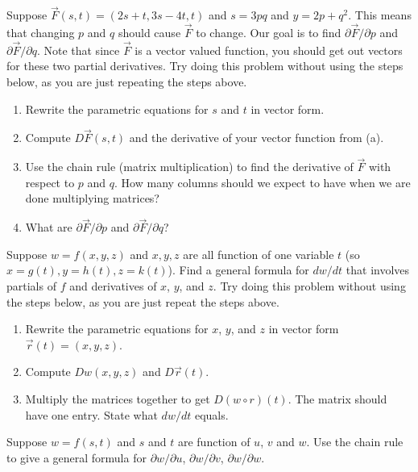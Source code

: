 \begin{problem}
 Suppose $\vec F(s,t) = (2s+t,3s-4t,t)$ and $s=3pq$ and $y=2p+q^2$.  This means that changing $p$ and $q$ should cause $\vec F$ to change. Our goal is to find $\partial \vec F/\partial p$ and $\partial \vec F/\partial q$. Note that since $\vec F$ is a vector valued function, you should get out vectors for these two partial derivatives. Try doing this problem without using the steps below, as you are just repeating the steps above.
 \begin{enumerate}
  \item Rewrite the parametric equations for $s$ and $t$ in vector form.
  \item Compute $D\vec F(s,t)$ and the derivative of your vector function from (a).  
  \item Use the chain rule (matrix multiplication) to find the derivative of $\vec F$ with respect to $p$ and $q$.  How many columns should we expect to have when we are done multiplying matrices?
  \item What are $\partial \vec F/\partial p$ and $\partial \vec F/\partial q$? 
 \end{enumerate}
\end{problem}


\begin{problem}%
 Suppose $w=f(x,y,z)$ and $x,y,z$ are all function of one variable $t$ (so $x=g(t), y=h(t), z=k(t)$).  
 Find a general formula for $dw/dt$ that involves partials of $f$ and derivatives of $x$, $y$, and $z$. Try doing this problem without using the steps below, as you are just repeat the steps above.
\begin{enumerate}
 \item Rewrite the parametric equations for $x$, $y$, and $z$ in vector form $\vec r(t) = (x,y,z)$.
 \item Compute $Dw(x,y,z)$ and $D\vec r(t)$. 
 \item Multiply the matrices together to get $D(w\circ r)(t)$.  The matrix should have one entry. State what $dw/dt$ equals.
\end{enumerate}
\end{problem}


\begin{problem}
 Suppose $w=f(s,t)$ and $s$ and $t$ are function of $u$, $v$ and $w$.  Use the chain rule to give a general formula for $\partial w/\partial u$, $\partial w/\partial v$, $\partial w/\partial w$. 
\end{problem}

